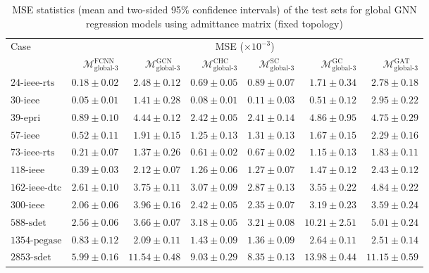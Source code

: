 \documentclass[journal]{IEEEtran}
\begin{document}
\begin{table*}[!ht]
\small
\caption{MSE statistics (mean and two-sided 95\% confidence intervals) of the test sets for global GNN regression models using admittance matrix (fixed topology)}
\label{tab:error_reg_global_admittance}
\def\na{---}
\centering
    \begin{tabular}{lr|rrrrr}
    \toprule
    \multirow{2}{*}{Case} & \multicolumn{6}{c}{MSE ($\times 10^{-3}$)} \\
    \cmidrule(r){2-7}
    & 
    $\mathcal{M}^{\textrm{FCNN}}_{\textrm{global-3}}$ &  $\mathcal{M}^{\textrm{GCN}}_{\textrm{global-3}}$ & $\mathcal{M}^{\textrm{CHC}}_{\textrm{global-3}}$ & $\mathcal{M}^{\textrm{SC}}_{\textrm{global-3}}$ & $\mathcal{M}^{\textrm{GC}}_{\textrm{global-3}}$ & $\mathcal{M}^{\textrm{GAT}}_{\textrm{global-3}}$ \\
    \midrule
    $\textrm{24-ieee-rts}$ & $0.18 \pm 0.02$ & $2.48 \pm 0.12$ & $0.69 \pm 0.05$ & $0.89 \pm 0.07$ & $1.71 \pm 0.34$ & $2.78 \pm 0.18$ \\
    $\textrm{30-ieee}$ & $0.05 \pm 0.01$ & $1.41 \pm 0.28$ & $0.08 \pm 0.01$ & $0.11 \pm 0.03$ & $0.51 \pm 0.12$ & $2.95 \pm 0.22$ \\
    $\textrm{39-epri}$ & $0.89 \pm 0.10$ & $4.44 \pm 0.12$ & $2.42 \pm 0.05$ & $2.41 \pm 0.14$ & $4.86 \pm 0.95$ & $4.75 \pm 0.29$ \\
    $\textrm{57-ieee}$ & $0.52 \pm 0.11$ & $1.91 \pm 0.15$ & $1.25 \pm 0.13$ & $1.31 \pm 0.13$ & $1.67 \pm 0.15$ & $2.29 \pm 0.16$ \\
    $\textrm{73-ieee-rts}$ & $0.21 \pm 0.07$ & $1.37 \pm 0.26$ & $0.61 \pm 0.02$ & $0.67 \pm 0.02$ & $1.15 \pm 0.13$ & $1.83 \pm 0.11$ \\
    $\textrm{118-ieee}$ & $0.39 \pm 0.03$ & $2.12 \pm 0.07$ & $1.26 \pm 0.06$ & $1.27 \pm 0.07$ & $1.47 \pm 0.12$ & $2.43 \pm 0.12$ \\
    $\textrm{162-ieee-dtc}$ & $2.61 \pm 0.10$ & $3.75 \pm 0.11$ & $3.07 \pm 0.09$ & $2.87 \pm 0.13$ & $3.55 \pm 0.22$ & $4.84 \pm 0.22$ \\
    $\textrm{300-ieee}$ & $2.06 \pm 0.06$ & $3.96 \pm 0.16$ & $2.42 \pm 0.05$ & $2.35 \pm 0.07$ & $3.19 \pm 0.23$ & $3.59 \pm 0.24$ \\
    $\textrm{588-sdet}$ & $2.56 \pm 0.06$ & $3.66 \pm 0.07$ & $3.18 \pm 0.05$ & $3.21 \pm 0.08$ & $10.21 \pm 2.51$ & $5.01 \pm 0.24$ \\
    $\textrm{1354-pegase}$ & $0.83 \pm 0.12$ & $2.09 \pm 0.11$ & $1.43 \pm 0.09$ & $1.36 \pm 0.09$ & $2.64 \pm 0.11$ & $2.51 \pm 0.14$ \\
    $\textrm{2853-sdet}$ & $5.99 \pm 0.16$ & $11.54 \pm 0.48$ & $9.03 \pm 0.29$ & $8.35 \pm 0.13$ & $13.98 \pm 0.44$ & $11.15 \pm 0.59$ \\
    \bottomrule
    \end{tabular}
\end{table*}
\end{document}
